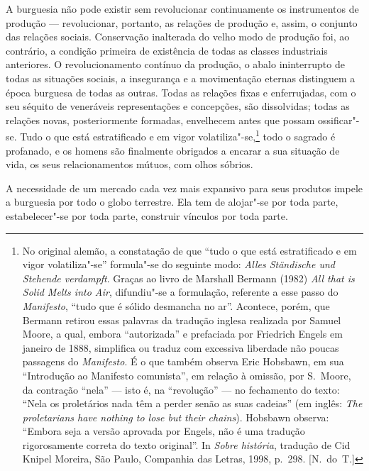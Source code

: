 A burguesia não pode existir sem revolucionar continuamente os
instrumentos de produção  ---  revolucionar, portanto, as relações de
produção e, assim, o conjunto das relações sociais. Conservação
inalterada do velho modo de produção foi, ao contrário, a condição
primeira de existência de todas as classes industriais anteriores. O
revolucionamento contínuo da produção, o abalo ininterrupto de todas as
situações sociais, a insegurança e a movimentação eternas distinguem a
época burguesa de todas as outras. Todas as relações fixas e
enferrujadas, com o seu séquito de veneráveis representações e
concepções, são dissolvidas; todas as relações novas, posteriormente
formadas, envelhecem antes que possam ossificar"-se. Tudo o que está
estratificado e em vigor
volatiliza"-se,\footnote{ No original alemão, a constatação de que      \label{2}
``tudo o que está estratificado e em vigor volatiliza"-se'' formula"-se		\EP[]
do seguinte modo: \textit{Alles Ständische und Stehende verdampft}.
Graças ao livro de Marshall Bermann (1982) \textit{All that is Solid
Melts into Air}, difundiu"-se a formulação, referente a esse passo do
\textit{Manifesto}, ``tudo que é sólido desmancha no ar''. Acontece,
porém, que Bermann retirou essas palavras da tradução inglesa realizada
por Samuel Moore, a qual, embora “autorizada” e prefaciada por
Friedrich Engels em janeiro de 1888, simplifica ou traduz com excessiva
liberdade não poucas passagens do \textit{Manifesto}. É o que
também observa Eric Hobsbawn, em sua ``Introdução ao Manifesto
comunista'', em relação à omissão, por S.~Moore, da contração ``nela''  --- 
isto é, na ``revolução''  ---  no fechamento do texto: ``Nela os proletários
nada têm a perder senão as suas cadeias'' (em inglês: \textit{The
proletarians have nothing to lose but their chains}). Hobsbawn observa:
``Embora seja a versão aprovada por Engels, não é uma tradução
rigorosamente correta do texto original''. In \textit{Sobre história},
tradução de Cid Knipel Moreira, São Paulo, Companhia das Letras, 1998,
p.~298. [N.~do~T.]} todo o sagrado é profanado, e os homens são finalmente
obrigados a encarar a sua situação de vida, os seus relacionamentos mútuos,
com olhos sóbrios.

A necessidade de um mercado cada vez mais expansivo para seus produtos
impele a burguesia por todo o globo terrestre. Ela tem de alojar"-se
por toda parte, estabelecer"-se por toda parte, construir vínculos por
toda parte.

